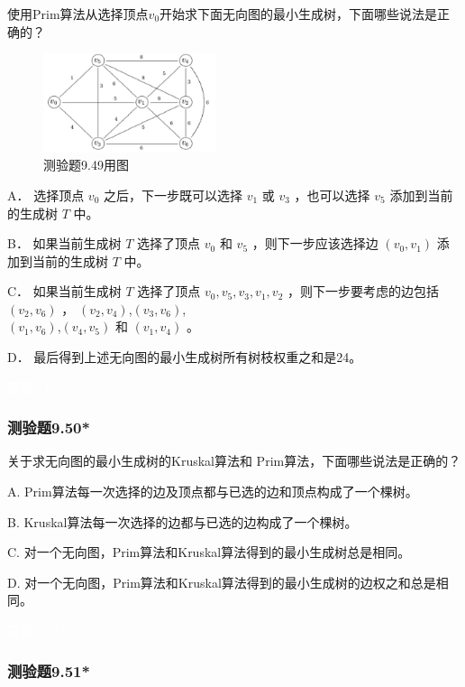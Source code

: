 \documentclass[UTF8, heading=true]{ctexart}
\begin{document}
使用Prim算法从选择顶点$v_0$开始求下面无向图的最小生成树，下面哪些说法是正确的？

\begin{figure}[H]
  \centering
  \includegraphics[width=0.45\textwidth]{9.48.jpg} %
  \caption{测验题9.49用图}
\end{figure}

A．
选择顶点 $v_0$ 之后，下一步既可以选择 $v_1$ 或 $v_3$ ，也可以选择 $v_5$ 添加到当前的生成树 $T$ 中。

B．
如果当前生成树 $T$ 选择了顶点 $v_0$ 和 $v_5$ ，则下一步应该选择边 $\left(v_0, v_1\right)$ 添加到当前的生成树 $T$ 中。

C．
如果当前生成树 $T$ 选择了顶点 $v_0, v_5, v_3, v_1, v_2$ ，则下一步要考虑的边包括 $\left(v_2, v_6\right)$ ， $\left(v_2, v_4\right)$,$\left(v_3, v_6\right)$,\\$\left(v_1, v_6\right)$,$\left(v_4, v_5\right)$ 和 $\left(v_1, v_4\right)$ 。

D．
最后得到上述无向图的最小生成树所有树枝权重之和是24。

\textcolor{white}{答案：C}

\subsubsection{测验题9.50*}

关于求无向图的最小生成树的Kruskal算法和
Prim算法，下面哪些说法是正确的？

A. Prim算法每一次选择的边及顶点都与已选的边和顶点构成了一个棵树。

B. Kruskal算法每一次选择的边都与已选的边构成了一个棵树。

C. 对一个无向图，Prim算法和Kruskal算法得到的最小生成树总是相同。

D.
对一个无向图，Prim算法和Kruskal算法得到的最小生成树的边权之和总是相同。

\textcolor{white}{答案：AD}

\subsubsection{测验题9.51*}
\end{document}
